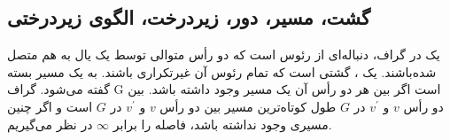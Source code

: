



\subsection{گشت، مسیر، دور، زیردرخت، الگوی زیردرختی}
یک  در گراف، دنباله‌ای از رئوس است که دو رأس متوالی توسط یک یال به هم متصل شده‌باشند. یک ، گشتی است که تمام رئوس آن غیرتکراری باشند. به یک مسیر بسته  گفته می‌شود. گراف G  است اگر بین هر دو رأس آن یک مسیر وجود داشته باشد.  بین دو رأس $v$ و $v^\prime$ در $G$ طول کوتاه‌ترین مسیر بین دو رأس $v$ و $v^\prime$ در $G$ است و اگر چنین مسیری وجود نداشته باشد، فاصله را برابر $\infty$ در نظر می‌گیریم.

